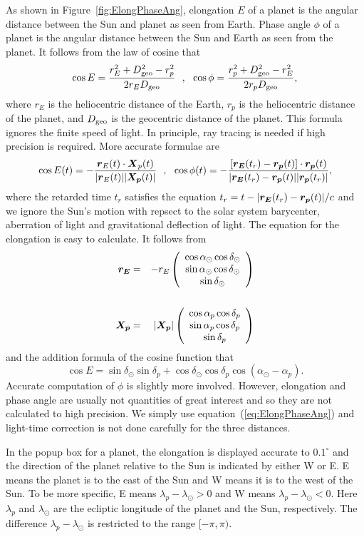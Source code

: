 \documentclass[12pt]{article}
\newcommand \beq {\begin{equation}}
\newcommand \eeq {\end{equation}}
\newcommand \beqn {\begin{eqnarray}}
\newcommand \eeqn {\end{eqnarray}}
\newcommand{\ve}[1]{\mbox{\boldmath $#1$}}
\begin{document}
As shown in Figure~\ref{fig:ElongPhaseAng}, elongation $E$ of a planet is the angular 
distance between the Sun and planet as seen from Earth. Phase angle $\phi$ of a planet 
is the angular distance between the Sun and Earth as seen from the planet. It follows 
from the law of cosine that 
\beq
  \cos E = \frac{r_E^2 + D_{\rm geo}^2 - r_p^2}{2 r_E D_{\rm geo}} \ \ , \ \ 
  \cos \phi = \frac{r_p^2 + D_{\rm geo}^2 - r_E^2}{2 r_p D_{\rm geo}} ,
\label{eq:ElongPhaseAng}
\eeq
where $r_E$ is the heliocentric distance of the Earth, $r_p$ is the heliocentric 
distance of the planet, and $D_{\rm geo}$ is the geocentric distance of the 
planet. This formula ignores the finite speed of light. 
In principle, ray tracing is needed if high precision 
is required. More accurate formulae are 
\beq
  \cos E(t) = -\frac{\ve{r}_E(t) \cdot \ve{X}_p(t)}{|\ve{r}_E(t)| |\ve{X_p}(t)|} \ \ , \ \ 
  \cos \phi(t) = -\frac{[\ve{r_E}(t_r)-\ve{r_p}(t)] \cdot \ve{r_p}(t)}
{|\ve{r_E}(t_r)-\ve{r_p}(t)| |\ve{r_p}(t_r)|} ,
\eeq
where the retarded time $t_r$ satisfies the equation 
$t_r=t-|\ve{r_E}(t_r)-\ve{r_p}(t)|/c$ and 
we ignore the Sun's motion with repsect to the solar system barycenter, aberration 
of light and gravitational deflection of light.
The equation for the elongation is easy to calculate. It follows 
from 
\beqn
  \ve{r_E} &=& - r_E \left( \begin{array}{c} 
\cos \alpha_{\odot} \cos \delta_{\odot} \\ 
\sin \alpha_{\odot} \cos \delta_{\odot} \\ 
\sin \delta_{\odot} \end{array} \right) \\ \cr 
\ve{X_p} &=& |\ve{X_p}| \left( \begin{array}{c} 
\cos \alpha_p \cos \delta_p \\ \sin \alpha_p \cos \delta_p \\ \sin \delta_p 
\end{array} \right)
\eeqn
and the addition formula of the cosine function that 
\beq
  \cos E = \sin \delta_{\odot} \sin \delta_p + 
\cos \delta_{\odot} \cos \delta_p \cos (\alpha_{\odot} - \alpha_p) .
\label{eq:Elong}
\eeq
Accurate computation of $\phi$ is slightly more involved. 
However, elongation and phase angle are usually not
quantities of great interest and so they are not calculated to 
high precision. We simply use 
equation~(\ref{eq:ElongPhaseAng}) and light-time correction is not done 
carefully for the three distances. 

In the popup box for a planet, the elongation is displayed accurate to $0.1^\circ$ 
and the direction of the planet relative to the Sun is indicated by either W or E. 
E means the planet is to the east of 
the Sun and W means it is to the west of the Sun. To be more specific, E means 
$\lambda_p-\lambda_{\odot} > 0$ and W means $\lambda_p-\lambda_{\odot} <0$. 
Here $\lambda_p$ and $\lambda_{\odot}$ are the ecliptic longitude of the planet 
and the Sun, respectively. The difference $\lambda_p-\lambda_{\odot}$ is restricted 
to the range $[-\pi,\pi)$.
\end{document}
